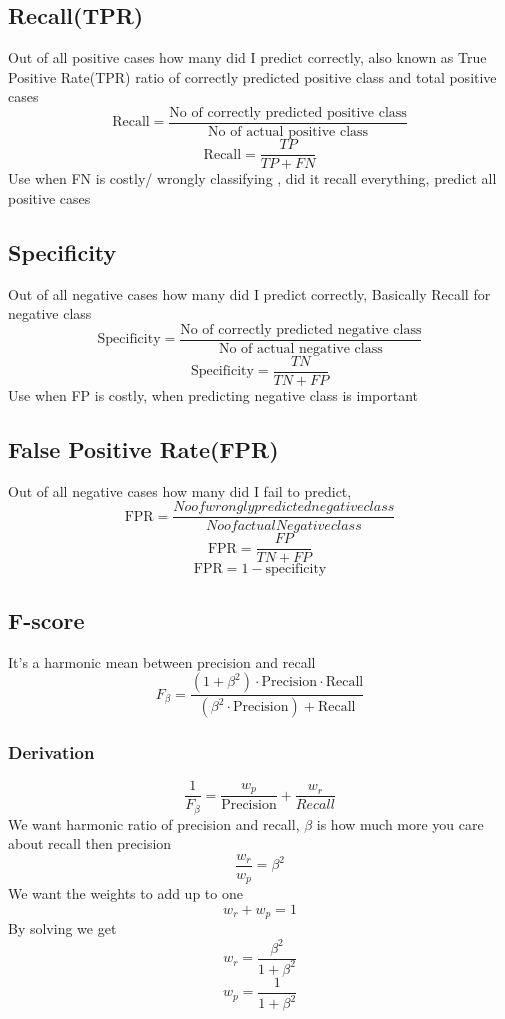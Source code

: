 \documentclass[12pt]{extarticle}
\begin{document}
\subsection{Recall(TPR)}
Out of all positive cases how many did I predict correctly, also known as True Positive Rate(TPR)
ratio of correctly predicted positive class and total positive cases
$$ \text{Recall} = \frac{\text{No of correctly predicted positive class}}{\text{No of actual positive class}}  $$
$$ \text{Recall} = \frac{TP}{TP+FN}$$
Use when FN is costly/ wrongly classifying , did it recall everything, predict all positive cases

\subsection{Specificity}
Out of all negative cases how many did I predict correctly, Basically Recall for negative class
$$ \text{Specificity} = \frac{\text{No of correctly predicted negative class}}{\text{No of actual negative class}}  $$
$$ \text{Specificity} = \frac{TN}{TN+FP}$$
Use when FP is costly, when predicting negative class is important

\subsection{False Positive Rate(FPR)}
Out of all negative cases how many did I fail to predict, 
$$ \text{FPR} = \frac{No of wrongly predicted negative class}{No of actual Negative class} $$
$$ \text{FPR} = \frac{FP}{TN+FP} $$
$$ \text{FPR} = 1 - \text{specificity}$$

\subsection{F-score}
It's a harmonic mean between precision and recall
$$F_\beta = \frac{(1 + \beta^2) \cdot \text{Precision} \cdot \text{Recall}}{(\beta^2 \cdot \text{Precision}) + \text{Recall}}$$
\subsubsection{Derivation} 
$$ \frac{1}{F_\beta} = \frac{w_p}{\text{Precision}} + \frac{w_r}{Recall} $$
We want harmonic ratio of precision and recall, 
$\beta$ is how much more you care about recall then precision
$$ \frac{w_r}{w_p} = \beta^2$$
We want the weights to add up to one
$$ w_r + w_p = 1 $$
By solving we get
$$ w_r = \frac{\beta^2}{1 + \beta^2} $$ 
$$ w_p = \frac{1}{1 + \beta^2} $$
\end{document}
